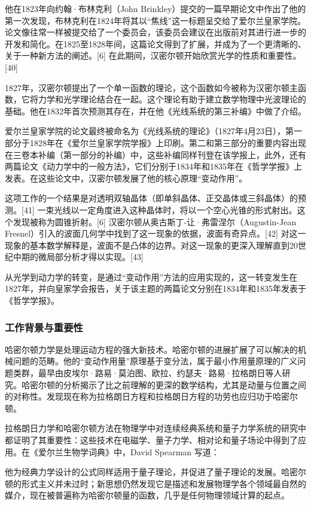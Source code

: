 他在1823年向约翰·布林克利（John Brinkley）提交的一篇早期论文中作出了他的第一次发现，布林克利在1824年将其以“焦线”这一标题呈交给了爱尔兰皇家学院。论文像往常一样被提交给了一个委员会，该委员会建议在出版前对其进行进一步的开发和简化。在1825至1828年间，这篇论文得到了扩展，并成为了一个更清晰的、关于一种新方法的阐述。[6] 在此期间，汉密尔顿开始欣赏光学的性质和重要性。[40]

1827年，汉密尔顿提出了一个单一函数的理论，这个函数如今被称为汉密尔顿主函数，它将力学和光学理论结合在一起。这个理论有助于建立数学物理中光波理论的基础。他在1832年首次预测其存在，并在他《光线系统的第三补编》中做了介绍。

爱尔兰皇家学院的论文最终被命名为《光线系统的理论》（1827年4月23日），第一部分于1828年在《爱尔兰皇家学院学报》上印刷。第二和第三部分的重要内容出现在三卷本补编（第一部分的补编）中，这些补编同样刊登在该学报上，此外，还有两篇论文《动力学中的一般方法》，它们分别于1834年和1835年在《哲学学报》上发表。在这些论文中，汉密尔顿发展了他的核心原理“变动作用”。

这项工作的一个结果是对透明双轴晶体（即单斜晶体、正交晶体或三斜晶体）的预测。[41] 一束光线以一定角度进入这种晶体时，将以一个空心光锥的形式射出。这个发现被称为圆锥折射。[6] 汉密尔顿从奥古斯丁-让·弗雷涅尔（Augustin-Jean Fresnel）引入的波面几何学中找到了这一现象的依据，波面有奇异点。[42] 对这一现象的基本数学解释是，波面不是凸体的边界。对这一现象的更深入理解直到20世纪中期的微局部分析才得以实现。[43]

从光学到动力学的转变，是通过“变动作用”方法的应用实现的，这一转变发生在1827年，并向皇家学会报告，关于该主题的两篇论文分别在1834年和1835年发表于《哲学学报》。
\subsubsection{工作背景与重要性}
哈密尔顿力学是处理运动方程的强大新技术。哈密尔顿的进展扩展了可以解决的机械问题的范畴。他的“变动作用量”原理基于变分法，属于最小作用量原理的广义问题类群，最早由皮埃尔·路易·莫泊图、欧拉、约瑟夫·路易·拉格朗日等人研究。哈密尔顿的分析揭示了比之前理解的更深的数学结构，尤其是动量与位置之间的对称性。发现现在称为拉格朗日方程和拉格朗日方程的功劳也应归功于哈密尔顿。

拉格朗日力学和哈密尔顿方法在物理学中对连续经典系统和量子力学系统的研究中都证明了其重要性：这些技术在电磁学、量子力学、相对论和量子场论中得到了应用。在《爱尔兰生物学词典》中，David Spearman 写道：

他为经典力学设计的公式同样适用于量子理论，并促进了量子理论的发展。哈密尔顿的形式主义并未过时；新思想仍然发现它是描述和发展物理学各个领域最自然的媒介，现在被普遍称为哈密尔顿量的函数，几乎是任何物理领域计算的起点。


